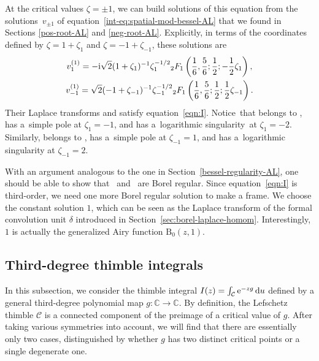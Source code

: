 \documentclass[pdftex]{sigma}
\newcommand{\singexp}[2]{\mathcal{H}L^\infty_{#1, #2}}
\newcommand{\singexpalg}[1]{\singexp{#1}{\bullet}}
\newcommand{\maps}{\colon}
\newcommand{\C}{\mathbb{C}}
\newcommand{\laplace}{\mathcal{L}}
\numberwithin{equation}{section}
\begin{document}
At the critical values $\zeta = \pm 1$, we can build solutions  of this equation from the solutions~$v_{\pm 1}$ of equation~\eqref{int-eq:spatial-mod-bessel-AL} that we found in Sections \ref{pos-root-AL} and \ref{neg-root-AL}. Explicitly, in terms of the coordinates defined by $\zeta = 1 + \zeta_1$ and $\zeta = -1 + \zeta_{-1}$, these solutions are
\begin{gather*}
v^{(1)}_1 = -{\rm i}\sqrt{2} (1 + \zeta_1)^{-1} \zeta_1^{-1/2} {}_2F_1\left(\frac{1}{6},\frac{5}{6};\frac{1}{2};-\frac{1}{2}\zeta_{1}\right), \\
v^{(1)}_{-1} = \sqrt{2} (-1 + \zeta_{-1})^{-1} \zeta_{-1}^{-1/2} {}_2F_1\left(\frac{1}{6},\frac{5}{6};\frac{1}{2};\frac{1}{2}\zeta_{-1}\right).
\end{gather*}
Their Laplace transforms \smash{$V^{(1)}_1 = \laplace_{\zeta, 1} v^{(1)}_1$} and \smash{$V^{(1)}_{-1} = \laplace_{\zeta, -1} v^{(1)}_{-1}$} satisfy equation~\eqref{eqn:I}. Notice~that  belongs to \smash{$\singexpalg{-1/2}(\Omega_1)$}, has a~simple pole at $\zeta_1 = -1$, and has a~logarithmic singularity~at $\zeta_1 = -2$. Similarly,  belongs to \smash{$\singexpalg{1/2}(\Omega_{-1})$}, has a~simple pole at $\zeta_{-1} = 1$, and has a~logarithmic singularity at $\zeta_{-1} = 2$.

With an argument analogous to the one in Section~\ref{bessel-regularity-AL}, one should be able to show that~ and~ are Borel regular. Since equation~\eqref{eqn:I} is third-order, we need one more Borel regular solution to make a frame. We choose the constant solution $1$, which can be seen as the Laplace transform of the formal convolution unit $\delta$ introduced in Section~\ref{sec:borel-laplace-homom}. Interestingly, $1$ is actually the generalized Airy function $\mathrm{B}_0(z,1)$.
%
\subsection{Third-degree thimble integrals}\label{sec:deg3}
In this subsection, we consider the thimble integral
$I(z) = \int_{\mathcal{C}} {\rm e}^{-zg}\, {\rm d}u$
defined by a general third-degree polynomial map $g \maps \C \to \C$. By definition, the Lefschetz thimble $\mathcal{C}$ is a connected component of the preimage of a critical value of $g$. After taking various symmetries into account, we will find that there are essentially only two cases, distinguished by whether $g$ has two distinct critical points or a single degenerate one.
\end{document}

